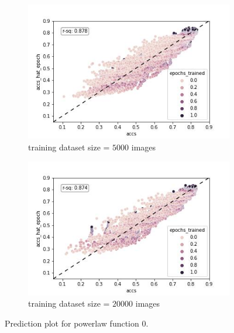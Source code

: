 \documentclass{article} %
\begin{document}
\begin{figure}
    \begin{subfigure}{.5\textwidth}
        \centering
        \includegraphics[width=.8\linewidth]{powerlaw_train_accs_hat_epoch}
        \caption{training dataset size = $5000$ images}
        \label{fig:powerlaw_acc_hat_epoch_train}
    \end{subfigure}%
    \begin{subfigure}{.5\textwidth}
        \centering
        \includegraphics[width=.8\linewidth]{powerlaw_val_accs_hat_epoch}
        \caption{training dataset size = $20000$ images}
        \label{fig:powerlaw_acc_hat_epoch_val}
    \end{subfigure}
    \caption{Prediction plot for powerlaw function 0.}
    \label{fig:powerlaw_acc_hat_epoch}
\end{figure}
\end{document}
